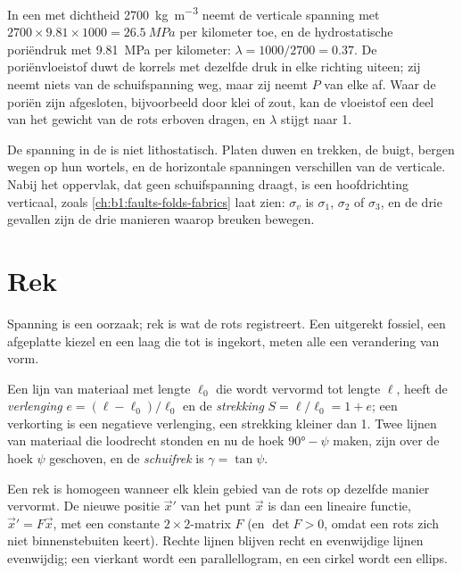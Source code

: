 In een  met dichtheid \qty{2700}{kg.m^{-3}} neemt de verticale spanning met $2700\times9.81\times1000 = \qty{26.5}{MPa}$ per kilometer toe, en de hydrostatische poriëndruk met \qty{9.81}{MPa} per kilometer: $\lambda = 1000/2700 = 0.37$.
De poriënvloeistof duwt de korrels met dezelfde druk in elke richting uiteen; zij neemt niets van de schuifspanning weg, maar zij neemt $P$ van elke  af. Waar de poriën zijn afgesloten, bijvoorbeeld door klei of zout, kan de vloeistof een deel van het gewicht van de rots erboven dragen, en $\lambda$ stijgt naar 1.

De spanning in de  is niet lithostatisch. Platen duwen en trekken, de  buigt, bergen wegen op hun wortels, en de horizontale spanningen verschillen van de verticale. Nabij het oppervlak, dat geen schuifspanning draagt, is een hoofdrichting verticaal, zoals \cref{ch:b1:faults-folds-fabrics} laat zien: $\sigma_v$ is $\sigma_1$, $\sigma_2$ of $\sigma_3$, en de drie gevallen zijn de drie manieren waarop breuken bewegen.

\section{Rek}\label{sec:b1:stress-strain-rheology:strain}

Spanning is een oorzaak; rek is wat de rots registreert. Een uitgerekt fossiel, een afgeplatte kiezel en een laag die tot  is ingekort, meten alle een verandering van vorm.

\begin{definition}\label{def:b1:stress-strain-rheology:strain}
Een lijn van materiaal met lengte $\ell_0$ die wordt vervormd tot lengte $\ell$, heeft de \emph{verlenging} $e = (\ell - \ell_0)/\ell_0$ en de \emph{strekking} $S = \ell/\ell_0 = 1 + e$; een verkorting is een negatieve verlenging, een strekking kleiner dan 1. Twee lijnen van materiaal die loodrecht stonden en nu de hoek $\ang{90} - \psi$ maken, zijn over de hoek $\psi$ geschoven, en de \emph{schuifrek} is $\gamma = \tan\psi$.
\end{definition}

Een rek is homogeen wanneer elk klein gebied van de rots op dezelfde manier vervormt. De nieuwe positie $\vec x'$ van het punt $\vec x$ is dan een lineaire functie, $\vec x' = F\vec x$, met een constante $2\times2$-matrix $F$ (en $\det F > 0$, omdat een rots zich niet binnenstebuiten keert). Rechte lijnen blijven recht en evenwijdige lijnen evenwijdig; een vierkant wordt een parallellogram, en een cirkel wordt een ellips.

